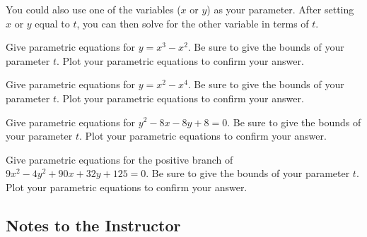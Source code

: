You could also use one of the variables ($x$ or $y$) as your parameter. After setting $x$ or $y$ equal to $t$, you can then solve for the other variable in terms of $t$.

\question Give parametric equations for $y=x^3-x^2$. Be sure to give the bounds of your parameter $t$. Plot your parametric equations to confirm your answer.

\question Give parametric equations for $y=x^2-x^4$. Be sure to give the bounds of your parameter $t$. Plot your parametric equations to confirm your answer.

\question Give parametric equations for $y^2-8x-8y+8=0$. Be sure to give the bounds of your parameter $t$. Plot your parametric equations to confirm your answer.

\question Give parametric equations for the positive branch of $9x^2-4y^2+90x+32y+125=0$. Be sure to give the bounds of your parameter $t$. Plot your parametric equations to confirm your answer.

\backmatter

\begin{annotation}
\chapter{Notes to the Instructor}
\renewcommand\notesname{}
\vspace{-2cm}
\begingroup
\setlength{\parskip}{2ex}
\renewcommand{\enotesize}{\normalsize}
\theendnotes
\endgroup
\end{annotation}



